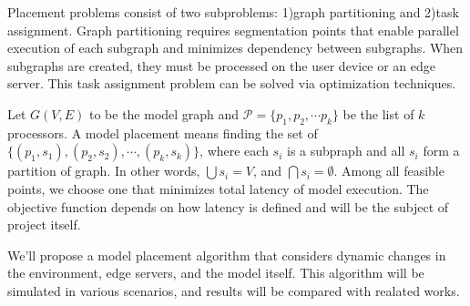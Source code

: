 \documentclass[lettersize,journal]{IEEEtran}
\begin{document}
Placement problems consist of two subproblems: 1)graph partitioning and 2)task assignment. Graph partitioning requires segmentation points that enable parallel execution of each subgraph and minimizes dependency between subgraphs. When subgraphs are created, they must be processed on the user device or an edge server. This task assignment problem can be solved via optimization techniques.

Let $G(V, E)$ to be the model graph and $\mathcal{P} = \{p_1, p_2, \cdots p_k\}$ be the list of $k$ processors. A model placement means finding the set of $\{(p_1, s_1), (p_2, s_2), \cdots, (p_k, s_k)\}$, where each $s_i$ is a subpraph and all $s_i$ form a partition of graph. In other words, $\bigcup s_i = V$, and $\bigcap s_i = \emptyset$. Among all feasible points, we choose one that minimizes total latency of model execution. The objective function depends on how latency is defined and will be the subject of project itself.

We'll propose a model placement algorithm that considers dynamic changes in the environment, edge servers, and the model itself. This algorithm will be simulated in various scenarios, and results will be compared with realated works.



\end{document}
